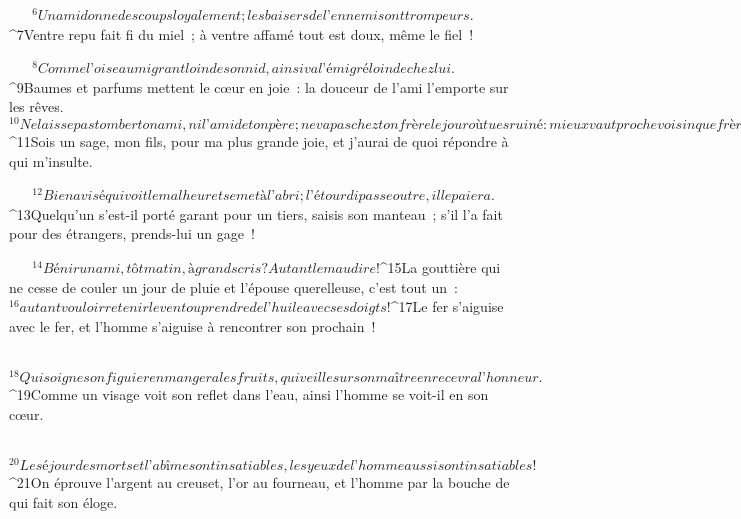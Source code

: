            
         
${}^{6}Un ami donne des coups loyalement ;
        les baisers de l’ennemi sont trompeurs.
        
           
         
${}^{7}Ventre repu fait fi du miel ;
        à ventre affamé tout est doux, même le fiel !
        
           
         
${}^{8}Comme l’oiseau migrant loin de son nid,
        ainsi va l’émigré loin de chez lui.
        
           
         
${}^{9}Baumes et parfums mettent le cœur en joie :
        la douceur de l’ami l’emporte sur les rêves.
${}^{10}Ne laisse pas tomber ton ami, ni l’ami de ton père ;
        ne va pas chez ton frère le jour où tu es ruiné :
        mieux vaut proche voisin que frère lointain !
        
           
         
${}^{11}Sois un sage, mon fils, pour ma plus grande joie,
        et j’aurai de quoi répondre à qui m’insulte.
        
           
         
${}^{12}Bien avisé qui voit le malheur et se met à l’abri ;
        l’étourdi passe outre, il le paiera.
        
           
         
${}^{13}Quelqu’un s’est-il porté garant pour un tiers, saisis son manteau ;
        s’il l’a fait pour des étrangers, prends-lui un gage !
        
           
         
${}^{14}Bénir un ami, tôt matin, à grands cris ?
        Autant le maudire !
        
           
         
${}^{15}La gouttière qui ne cesse de couler un jour de pluie
        et l’épouse querelleuse, c’est tout un :
${}^{16}autant vouloir retenir le vent
        ou prendre de l’huile avec ses doigts !
        
           
         
${}^{17}Le fer s’aiguise avec le fer,
        et l’homme s’aiguise à rencontrer son prochain !
        
           
         
${}^{18}Qui soigne son figuier en mangera les fruits,
        qui veille sur son maître en recevra l’honneur.
        
           
         
${}^{19}Comme un visage voit son reflet dans l’eau,
        ainsi l’homme se voit-il en son cœur.
        
           
         
${}^{20}Le séjour des morts et l’abîme sont insatiables,
        les yeux de l’homme aussi sont insatiables !
        
           
         
${}^{21}On éprouve l’argent au creuset, l’or au fourneau,
        et l’homme par la bouche de qui fait son éloge.
        
